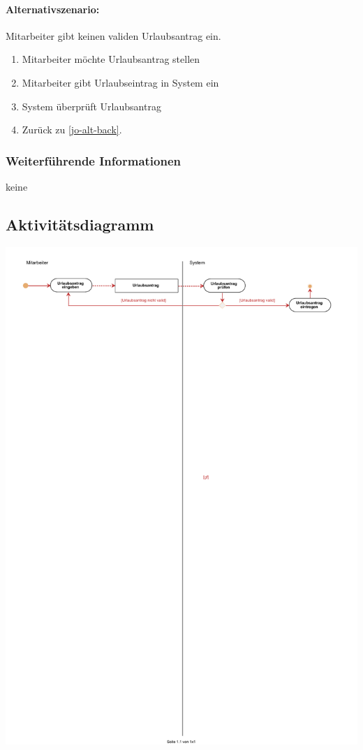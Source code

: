 \paragraph{Alternativszenario:} Mitarbeiter gibt keinen validen Urlaubsantrag ein.
\begin{enumerate}
\item Mitarbeiter möchte Urlaubsantrag stellen
\item Mitarbeiter gibt Urlaubseintrag in System ein \label{jo-alt-back}
\item System überprüft Urlaubsantrag
\item Zurück zu \ref{jo-alt-back}.
\end{enumerate}

\subsubsection{Weiterführende Informationen}
keine

\subsection{Aktivitätsdiagramm}

\begin{center}
	\includegraphics[width=0.9\linewidth]{Urlaub_einreichen.pdf}
\end{center}

